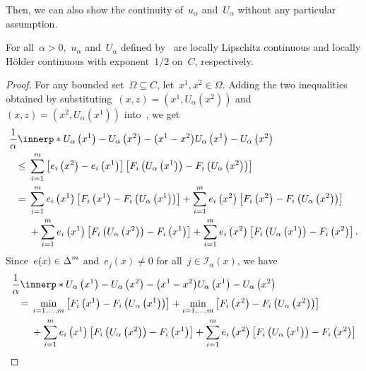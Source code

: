 \documentclass[../../main]{subfiles}
\begin{document}
Then, we can also show the continuity of~$u_\alpha$ and~$U_\alpha$ without any particular assumption.
\begin{theorem} 
    For all~$\alpha > 0$,~$u_\alpha$ and~$U_\alpha$ defined by~ are locally Lipschitz continuous and locally H\"older continuous with exponent~$1 / 2$ on~$C$, respectively.
\end{theorem}
\begin{proof}
    For any bounded set~$\Omega \subseteq C$, let~$x^1, x^2 \in \Omega$.
    Adding the two inequalities obtained by substituting~$(x, z) = (x^1, U_\alpha\left(x^2\right))$ and~$(x, z) = (x^2, U_\alpha\left(x^1\right))$ into~, we get
    \begin{align}
        \MoveEqLeft \frac{1}{\alpha} \innerp*{U_\alpha\left(x^1\right) - U_\alpha\left(x^2\right) - \left(x^1 - x^2\right)}{U_\alpha\left(x^1\right) - U_\alpha\left(x^2\right)} \\
        \le{}& \sum_{i = 1}^{m} \left[e_i\left(x^2\right) - e_i\left(x^1\right)\right] \left[ F_i\left(U_\alpha\left(x^1\right)\right) - F_i\left(U_\alpha\left(x^2\right)\right) \right] \\
        ={}& \sum_{i = 1}^{m} e_i\left(x^1\right) \left[ F_i\left(x^1\right) - F_i\left(U_\alpha\left(x^1\right)\right) \right] + \sum_{i = 1}^{m} e_i\left(x^2\right) \left[ F_i\left(x^2\right) - F_i\left(U_\alpha\left(x^2\right)\right) \right] \\
           &+ \sum_{i = 1}^{m} e_i\left(x^1\right) \left[ F_i\left(U_\alpha\left(x^2\right)\right) - F_i\left(x^1\right) \right] + \sum_{i = 1}^{m} e_i\left(x^2\right) \left[ F_i\left(U_\alpha\left(x^1\right)\right) - F_i\left(x^2\right) \right]
    .\end{align}
    Since~$e(x) \in \operatorname{\Delta}^m$ and~$e_j(x) \neq 0$ for all~$j \in \mathscr{I}_\alpha(x)$, we have
    \begin{align}
        \MoveEqLeft \frac{1}{\alpha} \innerp*{U_\alpha\left(x^1\right) - U_\alpha\left(x^2\right) - \left(x^1 - x^2\right)}{U_\alpha\left(x^1\right) - U_\alpha\left(x^2\right)} \\
        ={}& \min_{i = 1, \dots, m} \left[ F_i\left(x^1\right) - F_i\left(U_\alpha\left(x^1\right)\right) \right] + \min_{i = 1, \dots, m} \left[ F_i\left(x^2\right) - F_i\left(U_\alpha\left(x^2\right)\right) \right] \\
           &+ \sum_{i = 1}^{m} e_i\left(x^1\right) \left[ F_i\left(U_\alpha\left(x^2\right)\right) - F_i\left(x^1\right) \right] + \sum_{i = 1}^{m} e_i\left(x^2\right) \left[ F_i\left(U_\alpha\left(x^1\right)\right) - F_i\left(x^2\right) \right]

\end{align}
\end{proof}
\end{document}
